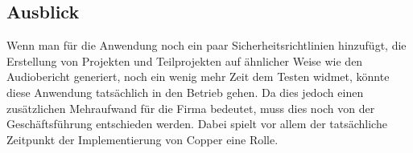 \subsection{Ausblick}
\label{sec:Ausblick}
Wenn man für die Anwendung noch ein paar Sicherheitsrichtlinien hinzufügt, die Erstellung von Projekten und Teilprojekten auf ähnlicher Weise wie den Audiobericht generiert, noch ein wenig mehr Zeit dem Testen widmet, könnte diese Anwendung tatsächlich in den Betrieb gehen. Da dies jedoch einen zusätzlichen Mehraufwand für die Firma bedeutet, muss dies noch von der Geschäftsführung entschieden werden. Dabei spielt vor allem der tatsächliche Zeitpunkt der Implementierung von Copper eine Rolle.
